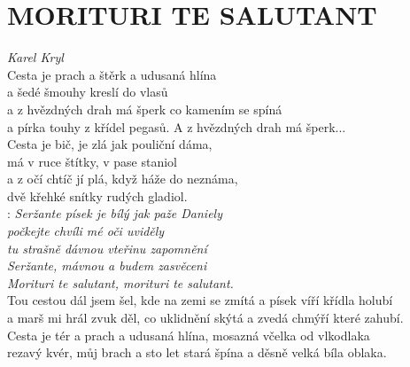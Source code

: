 \section*{\Huge MORITURI TE SALUTANT}
\emph{Karel Kryl}\\

Cesta je prach a štěrk a udusaná hlína\\
a šedé šmouhy kreslí do vlasů\\
a z hvězdných drah má šperk co kamením se spíná\\
a pírka touhy z křídel pegasů. A z hvězdných drah má šperk...\\

Cesta je bič, je zlá jak pouliční dáma,\\
má v ruce štítky, v pase staniol\\
a z očí chtíč jí plá, když háže do neznáma,\\
dvě křehké snítky rudých gladiol.\\

\textregistered: \emph{Seržante písek je bílý jak paže Daniely\\
počkejte chvíli mé oči uviděly\\
tu strašně dávnou vteřinu zapomnění\\
Seržante, mávnou a budem zasvěceni\\
Morituri te salutant, morituri te salutant.}\\

Tou cestou dál jsem šel, kde na zemi se zmítá a písek víří křídla holubí\\
a marš mi hrál zvuk děl, co uklidnění skýtá a zvedá chmýří které zahubí.\\

Cesta je tér a prach a udusaná hlína, mosazná včelka od vlkodlaka\\
rezavý kvér, můj brach a sto let stará špína a děsně velká bíla oblaka. \textregistered

\newpage
